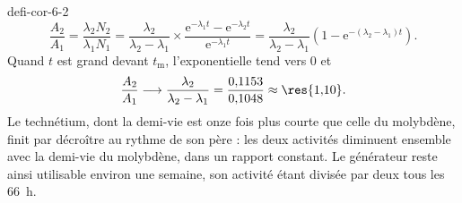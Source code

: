 \begin{blocEdition}{defi-cor-6-2}
\label{figedition-defi-cor-6-2-1}
\[\frac{A_2}{A_1}=\frac{\lambda_2N_2}{\lambda_1N_1}=\frac{\lambda_2}{\lambda_2-\lambda_1}\times\frac{\mathrm{e}^{-\lambda_1t}-\mathrm{e}^{-\lambda_2t}}{\mathrm{e}^{-\lambda_1t}}
=\frac{\lambda_2}{\lambda_2-\lambda_1}\left(1-\mathrm{e}^{-(\lambda_2-\lambda_1)t}\right).\]
Quand $t$ est grand devant $t_\mathrm{m}$, l'exponentielle tend vers 0 et
\[\frac{A_2}{A_1}\longrightarrow\frac{\lambda_2}{\lambda_2-\lambda_1}=\frac{0{,}1153}{0{,}1048}\approx\res{1{,}10}.\]
Le technétium, dont la demi-vie est onze fois plus courte que celle du molybdène, finit par décroître au rythme de
son père : les deux activités diminuent ensemble avec la demi-vie du molybdène, dans un rapport constant. Le
générateur reste ainsi utilisable environ une semaine, son activité étant divisée par deux tous les 66~h.
\end{blocEdition}

